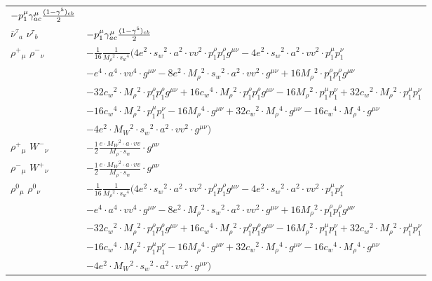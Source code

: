 \begin{center}
\begin{tabular}{|l|l|}
	$-p_1^\mu \gamma_{a c}^\mu {(1-\gamma^5)_{c b}\over 2} $\\[2mm]
$\bar{\nu}^\tau{}_{a }$ \phantom{-} $\nu^\tau{}_{b }$ \phantom{-}  &
	$-p_1^\mu \gamma_{a c}^\mu {(1-\gamma^5)_{c b}\over 2} $\\[2mm]
$\rho^+{}_{\mu }$ \phantom{-} $\rho^-{}_{\nu }$ \phantom{-}  &
	$-\frac{1}{16}\frac{1}{ M_{\rho}{}^2  \cdot s_w{}^4 }\big(4 e{}^2 \cdot  s_w{}^2 \cdot  a{}^2 \cdot  vv{}^2 \cdot p_1^\rho p_1^\rho g^{\mu \nu} -4 e{}^2 \cdot  s_w{}^2 \cdot  a{}^2 \cdot  vv{}^2 \cdot p_1^\mu p_1^\nu $ \\[2mm]
  & $- e{}^4 \cdot  a{}^4 \cdot  vv{}^4 \cdot g^{\mu \nu} -8 e{}^2 \cdot  M_{\rho}{}^2 \cdot  s_w{}^2 \cdot  a{}^2 \cdot  vv{}^2 \cdot g^{\mu \nu} +16 M_{\rho}{}^2 \cdot p_1^\rho p_1^\rho g^{\mu \nu} $ \\[2mm]
  & $-32 c_w{}^2 \cdot  M_{\rho}{}^2 \cdot p_1^\rho p_1^\rho g^{\mu \nu} +16 c_w{}^4 \cdot  M_{\rho}{}^2 \cdot p_1^\rho p_1^\rho g^{\mu \nu} -16 M_{\rho}{}^2 \cdot p_1^\mu p_1^\nu +32 c_w{}^2 \cdot  M_{\rho}{}^2 \cdot p_1^\mu p_1^\nu $ \\[2mm]
  & $-16 c_w{}^4 \cdot  M_{\rho}{}^2 \cdot p_1^\mu p_1^\nu -16 M_{\rho}{}^4 \cdot g^{\mu \nu} +32 c_w{}^2 \cdot  M_{\rho}{}^4 \cdot g^{\mu \nu} -16 c_w{}^4 \cdot  M_{\rho}{}^4 \cdot g^{\mu \nu} $ \\[2mm]
  & $-4 e{}^2 \cdot  M_W{}^2 \cdot  s_w{}^2 \cdot  a{}^2 \cdot  vv{}^2 \cdot g^{\mu \nu} \big)$\\[2mm]
$\rho^+{}_{\mu }$ \phantom{-} $W^-{}_{\nu }$ \phantom{-}  &
	$-\frac{1}{2}\frac{ e \cdot M_W{}^2  \cdot a \cdot vv}{ M_{\rho} \cdot s_w}\cdot g^{\mu \nu} $\\[2mm]
$\rho^-{}_{\mu }$ \phantom{-} $W^+{}_{\nu }$ \phantom{-}  &
	$-\frac{1}{2}\frac{ e \cdot M_W{}^2  \cdot a \cdot vv}{ M_{\rho} \cdot s_w}\cdot g^{\mu \nu} $\\[2mm]
$\rho^0{}_{\mu }$ \phantom{-} $\rho^0{}_{\nu }$ \phantom{-}  &
	$-\frac{1}{16}\frac{1}{ M_{\rho}{}^2  \cdot s_w{}^4 }\big(4 e{}^2 \cdot  s_w{}^2 \cdot  a{}^2 \cdot  vv{}^2 \cdot p_1^\rho p_1^\rho g^{\mu \nu} -4 e{}^2 \cdot  s_w{}^2 \cdot  a{}^2 \cdot  vv{}^2 \cdot p_1^\mu p_1^\nu $ \\[2mm]
  & $- e{}^4 \cdot  a{}^4 \cdot  vv{}^4 \cdot g^{\mu \nu} -8 e{}^2 \cdot  M_{\rho}{}^2 \cdot  s_w{}^2 \cdot  a{}^2 \cdot  vv{}^2 \cdot g^{\mu \nu} +16 M_{\rho}{}^2 \cdot p_1^\rho p_1^\rho g^{\mu \nu} $ \\[2mm]
  & $-32 c_w{}^2 \cdot  M_{\rho}{}^2 \cdot p_1^\rho p_1^\rho g^{\mu \nu} +16 c_w{}^4 \cdot  M_{\rho}{}^2 \cdot p_1^\rho p_1^\rho g^{\mu \nu} -16 M_{\rho}{}^2 \cdot p_1^\mu p_1^\nu +32 c_w{}^2 \cdot  M_{\rho}{}^2 \cdot p_1^\mu p_1^\nu $ \\[2mm]
  & $-16 c_w{}^4 \cdot  M_{\rho}{}^2 \cdot p_1^\mu p_1^\nu -16 M_{\rho}{}^4 \cdot g^{\mu \nu} +32 c_w{}^2 \cdot  M_{\rho}{}^4 \cdot g^{\mu \nu} -16 c_w{}^4 \cdot  M_{\rho}{}^4 \cdot g^{\mu \nu} $ \\[2mm]
  & $-4 e{}^2 \cdot  M_W{}^2 \cdot  s_w{}^2 \cdot  a{}^2 \cdot  vv{}^2 \cdot g^{\mu \nu} \big)$\\ \hline
\end{tabular}


\end{center}
